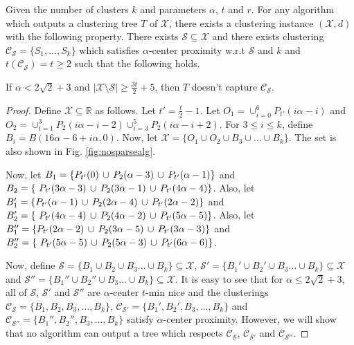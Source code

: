 \documentclass[anon,12pt]{colt2016} %
\newcommand{\mc}{\mathcal}
\begin{document}
\begin{theorem}
\label{thm:nosparsealg}
Given the number of clusters $k$ and parameters $\alpha$, $t$ and $r$. For any algorithm which outputs a clustering tree $T$ of $\mc X$, there exists a clustering instance $(\mc X, d)$ with the following property. There exists $\mc S \subseteq \mc X$ and there exists clustering $\mc C_{\mc S} = \{S_1, \ldots, S_k\}$ which satisfies $\alpha$-center proximity w.r.t $\mc S$ and $k$ and $ t(\mc C_{\mc S}) = t \ge 2$ such that the following holds. 

If $\alpha < 2\sqrt 2 + 3$ and $|\mc X \setminus \mc S| \ge \frac{3t}{2}+5$, then $T$ doesn't capture $\mc C_{\mc S}$.
\end{theorem}

\begin{proof}
Define $\mc X \subseteq \mathbb{R}$ as follows. Let $t' = \frac{t}{2}-1$. Let $O_1 = \cup_{i=0}^6 P_{t'}(i\alpha-i)$ and $O_2 = \cup_{i=1}^3 P_2(i\alpha-i-2) \cup_{i=3}^5 P_2(i\alpha-i+2)$. For $3\le i\le k$, define $B_i = B(16\alpha-6+i\alpha, 0)$. Now, let $\mc X = \{O_1 \cup O_2 \cup B_3 \cup \ldots \cup B_k\}$. The set is also shown in Fig. \ref{fig:nosparsealg}.

Now, let $B_1 = \{P_{t'}(0) \thinspace\cup\thinspace  P_{2}(\alpha-3) \thinspace\cup\thinspace P_{t'}(\alpha-1) \}$ and $B_2 = \{\ P_{t'}(3\alpha-3) \thinspace\cup\thinspace P_{2}(3\alpha-1)\thinspace\cup\thinspace P_{t'}(4\alpha-4)\}$. Also, let $B_1' = \{P_{t'}(\alpha-1) \thinspace\cup\thinspace  P_{2}(2\alpha-4) \thinspace\cup\thinspace P_{t'}(2\alpha-2) \}$ and $B_2' = \{\ P_{t'}(4\alpha-4) \thinspace\cup\thinspace P_{2}(4\alpha-2)\thinspace\cup\thinspace P_{t'}(5\alpha-5)\}$. Also, let $B_1'' = \{P_{t'}(2\alpha-2) \thinspace\cup\thinspace  P_{2}(3\alpha-5) \thinspace\cup\thinspace P_{t'}(3\alpha-3) \}$ and $B_2'' = \{\ P_{t'}(5\alpha-5) \thinspace\cup\thinspace P_{2}(5\alpha-3)\thinspace\cup\thinspace P_{t'}(6\alpha-6)\}$. 

Now, define $\mc S = \{B_1 \cup B_2 \cup B_3\ldots \cup B_k\} \subseteq \mc X$, $\mc S' = \{B_1' \cup B_2' \cup B_3\ldots \cup B_k\} \subseteq \mc X$ and $\mc S'' = \{B_1'' \cup B_2'' \cup B_3\ldots \cup B_k\} \subseteq \mc X$. It is easy to see that for $\alpha \le 2\sqrt{2} + 3$, all of $\mc S$, $\mc S'$ and $\mc S''$ are $\alpha$-center $t$-min nice and the clusterings $\mc C_{\mc S} = \{B_1, B_2, B_3, \ldots, B_k\}$, $\mc C_{\mc S'} = \{B_1', B_2', B_3, \ldots, B_k\}$ and $\mc C_{\mc S''} = \{B_1'', B_2'', B_3, \ldots, B_k\}$ satisfy $\alpha$-center proximity. However, we will show that no algorithm can output a tree which respects $\mc C_{\mc S}$, $\mc C_{\mc S'}$ and $\mc C_{\mc S''}$.


\end{proof}
\end{document}
